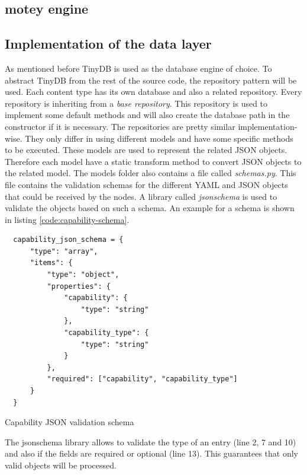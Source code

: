 \subsection{motey engine}

\subsection{Implementation of the data layer}
\label{subsection:impl-data-layer}
As mentioned before TinyDB is used as the database engine of choice.
To abstract TinyDB from the rest of the source code, the repository pattern will be used.
Each content type has its own database and also a related repository.
Every repository is inheriting from a \textit{base repository}.
This repository is used to implement some default methods and will also create the database path in the constructor if it is necessary.
The repositories are pretty similar implementation-wise.
They only differ in using different models and have some specific methods to be executed.
These models are used to represent the related \ac{JSON} objects.
Therefore each model have a static transform method to convert \ac{JSON} objects to the related model.
The models folder also contains a file called \textit{schemas.py}.
This file contains the validation schemas for the different \ac{YAML} and \ac{JSON} objects that could be received by the nodes.
A library called \textit{jsonschema} is used to validate the objects based on such a schema.
An example for a schema is shown in listing \ref{code:capability-schema}.
\begin{listing}[H]
  \begin{verbatim}
  capability_json_schema = {
      "type": "array",
      "items": {
          "type": "object",
          "properties": {
              "capability": {
                  "type": "string"
              },
              "capability_type": {
                  "type": "string"
              }
          },
          "required": ["capability", "capability_type"]
      }
  }
  \end{verbatim}
  \caption{Capability JSON validation schema}
  \label{code:capability-schema}
\end{listing}
The jsonschema library allows to validate the type of an entry (line 2, 7 and 10) and also if the fields are required or optional (line 13).
This guarantees that only valid objects will be processed.

